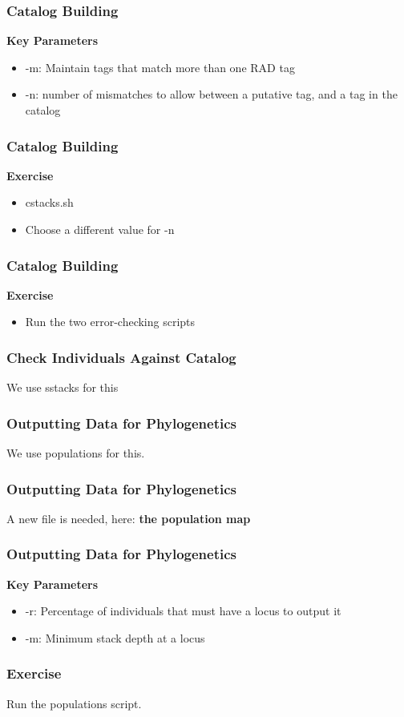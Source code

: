 \documentclass{beamer}
\begin{document}
\begin{frame}
\frametitle{Catalog Building}
\textbf{Key Parameters}
\begin{itemize}
\item -m: Maintain tags that match more than one RAD tag
\item -n: number of mismatches to allow between a putative tag, and a tag in the catalog
\end{itemize}
\end{frame}

\begin{frame}
\frametitle{Catalog Building}
\textbf{Exercise}
\begin{itemize}
\item cstacks.sh
\item Choose a different value for -n
\end{itemize}
\end{frame}

\begin{frame}
\frametitle{Catalog Building}
\textbf{Exercise}
\begin{itemize}
\item Run the two error-checking scripts
\end{itemize}
\end{frame}

\begin{frame}
\frametitle{Check Individuals Against Catalog}
We use sstacks for this
\end{frame}

\begin{frame}
\frametitle{Outputting Data for Phylogenetics}
We use populations for this. 
\end{frame}

\begin{frame}
\frametitle{Outputting Data for Phylogenetics}
A new file is needed, here: \textbf{the population map}
\end{frame}

\begin{frame}
\frametitle{Outputting Data for Phylogenetics}
\textbf{Key Parameters}
\begin{itemize}
\item -r: Percentage of individuals that must have a locus to output it
\item -m: Minimum stack depth at a locus
\end{itemize}
\end{frame}


\begin{frame}
\frametitle{Exercise}
Run the populations script. 
\end{frame}
\end{document}
